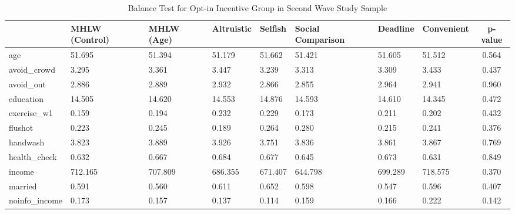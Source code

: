 \begin{table}[!h]

\caption{Balance Test for Opt-in Incentive Group in Second Wave Study Sample \label{tab:act-coupon0-balance}}
\centering
\fontsize{9}{11}\selectfont
\begin{threeparttable}
\begin{tabular}[t]{l>{\centering\arraybackslash}p{3em}>{\centering\arraybackslash}p{3em}>{\centering\arraybackslash}p{3em}>{\centering\arraybackslash}p{3em}>{\centering\arraybackslash}p{3em}>{\centering\arraybackslash}p{3em}>{\centering\arraybackslash}p{3em}c}
\toprule
  & MHLW (Control) & MHLW (Age) & Altruistic & Selfish & Social Comparison & Deadline & Convenient & p-value\\
\midrule
age & \num{51.695} & \num{51.394} & \num{51.179} & \num{51.662} & \num{51.421} & \num{51.605} & \num{51.512} & \num{0.564}\\
avoid\_crowd & \num{3.295} & \num{3.361} & \num{3.447} & \num{3.239} & \num{3.313} & \num{3.309} & \num{3.433} & \num{0.437}\\
avoid\_out & \num{2.886} & \num{2.889} & \num{2.932} & \num{2.866} & \num{2.855} & \num{2.964} & \num{2.941} & \num{0.960}\\
education & \num{14.505} & \num{14.620} & \num{14.553} & \num{14.876} & \num{14.593} & \num{14.610} & \num{14.345} & \num{0.472}\\
exercise\_w1 & \num{0.159} & \num{0.194} & \num{0.232} & \num{0.229} & \num{0.173} & \num{0.211} & \num{0.202} & \num{0.432}\\
flushot & \num{0.223} & \num{0.245} & \num{0.189} & \num{0.264} & \num{0.280} & \num{0.215} & \num{0.241} & \num{0.376}\\
handwash & \num{3.823} & \num{3.889} & \num{3.926} & \num{3.751} & \num{3.836} & \num{3.861} & \num{3.867} & \num{0.769}\\
health\_check & \num{0.632} & \num{0.667} & \num{0.684} & \num{0.677} & \num{0.645} & \num{0.673} & \num{0.631} & \num{0.849}\\
income & \num{712.165} & \num{707.809} & \num{686.355} & \num{671.407} & \num{644.798} & \num{699.289} & \num{718.575} & \num{0.370}\\
married & \num{0.591} & \num{0.560} & \num{0.611} & \num{0.652} & \num{0.598} & \num{0.547} & \num{0.596} & \num{0.407}\\
noinfo\_income & \num{0.173} & \num{0.157} & \num{0.137} & \num{0.114} & \num{0.159} & \num{0.166} & \num{0.222} & \num{0.142}\\

\end{tabular}
\end{threeparttable}
\end{table}
